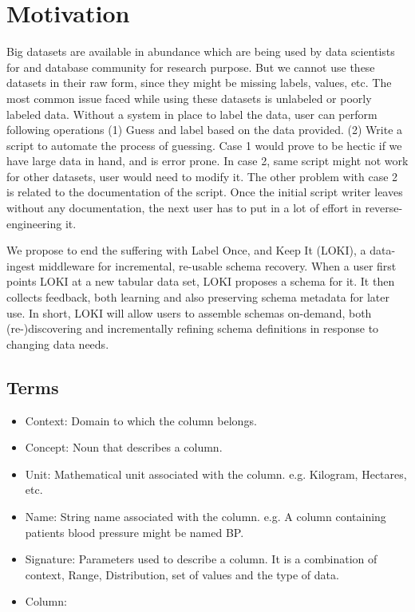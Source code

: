 \documentclass{vldb}
\begin{document}
\section{Motivation}
Big datasets are available in abundance which are being used by data scientists for and database community for research purpose. But we cannot use these datasets in their raw form, since they might be missing labels, values, etc. The most common issue faced while using these datasets is unlabeled or poorly labeled data. Without a system in place to label the data, user can perform following operations (1) Guess and label based on the data provided. (2) Write a script to automate the process of guessing. Case 1 would prove to be hectic if we have large data in hand, and is error prone. In case 2, same script might not work for other datasets, user would need to modify it. The other problem with case 2 is related to the documentation of the script. Once the initial script writer leaves without any documentation, the next user has to put in a lot of effort in reverse-engineering it.

We propose to end the suffering with Label Once, and Keep It (LOKI),
a data-ingest middleware for incremental, re-usable schema recovery.
When a user first points LOKI at a new tabular data set, LOKI proposes a schema for it. It then collects feedback, both learning and also preserving schema metadata for later use. In short, LOKI will allow users to assemble schemas on-demand, both (re-)discovering and incrementally refining schema definitions in response to changing data needs. 

\subsection{Terms}
\begin{itemize}
	\item Context: Domain to which the column belongs.
	\item Concept: Noun that describes a column.
	\item Unit: Mathematical unit associated with the column. e.g. Kilogram, Hectares, etc.
	\item Name: String name associated with the column. e.g. A column containing patients blood pressure might be named BP.
	\item Signature: Parameters used to describe a column. It is a combination of context, Range, Distribution, set of values and the type of data.
	\item Column: 
\end{itemize}
\end{document}
